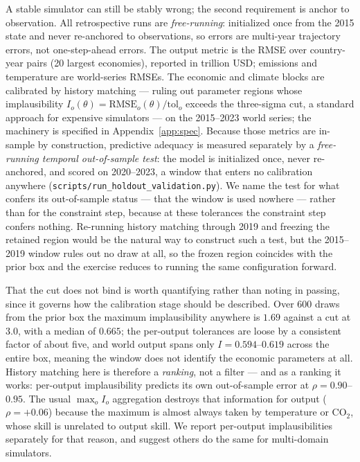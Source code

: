 \documentclass[a4paper,fleqn]{cas-sc}
\begin{document}
A stable simulator can still be stably wrong; the second requirement is anchor to observation.
All retrospective runs are \emph{free-running}: initialized once from the 2015 state and never
re-anchored to observations, so errors are multi-year trajectory errors, not one-step-ahead
errors. The output metric is the RMSE over country-year pairs (20 largest economies), reported
in trillion USD; emissions and temperature are world-series RMSEs. The economic and climate
blocks are calibrated by history matching --- ruling out parameter regions whose implausibility
$I_o(\theta)=\mathrm{RMSE}_o(\theta)/\mathrm{tol}_o$ exceeds the three-sigma cut, a standard
approach for expensive simulators \citep{williamson2013} --- on the 2015--2023 world series;
the machinery is specified in Appendix~\ref{app:spec}. Because those metrics are in-sample by
construction, predictive adequacy is measured separately by a \emph{free-running temporal
out-of-sample test}: the model is initialized once, never re-anchored, and scored on 2020--2023,
a window that enters no calibration anywhere (\texttt{scripts/run\_holdout\_validation.py}).
We name the test for what confers its out-of-sample status --- that the window is used nowhere
--- rather than for the constraint step, because at these tolerances the constraint step confers
nothing. Re-running history matching through 2019 and freezing the retained region would be the
natural way to construct such a test, but the 2015--2019 window rules out no draw at all, so the
frozen region coincides with the prior box and the exercise reduces to running the same
configuration forward.

That the cut does not bind is worth quantifying rather than noting in passing, since it governs
how the calibration stage should be described. Over 600 draws from the prior box the maximum implausibility anywhere is $1.69$ against a cut at
$3.0$, with a median of $0.665$; the per-output tolerances are loose by a consistent factor of
about five, and world output spans only $I=0.594$--$0.619$ across the entire box, meaning the
window does not identify the economic parameters at all. History matching here is therefore a
\emph{ranking}, not a filter --- and as a ranking it works: per-output implausibility predicts
its own out-of-sample error at $\rho=0.90$--$0.95$. The usual $\max_o I_o$ aggregation destroys
that information for output ($\rho=+0.06$) because the maximum is almost always taken by
temperature or CO$_2$, whose skill is unrelated to output skill. We report per-output
implausibilities separately for that reason, and suggest others do the same for multi-domain
simulators.
\end{document}
